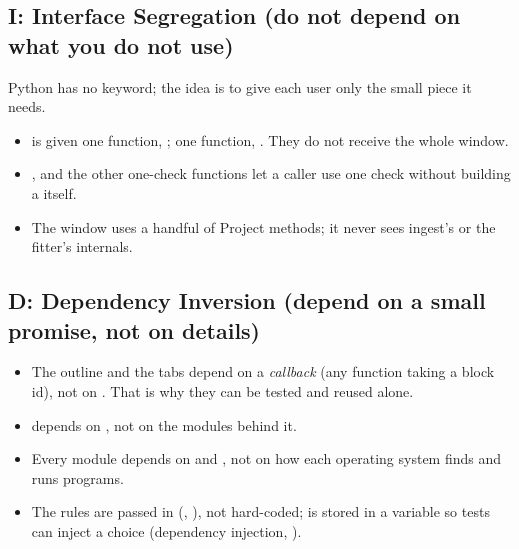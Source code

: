 \subsection*{I: Interface Segregation (do not depend on what you do not use)}
Python has no  keyword; the idea is to give each user only the small piece it needs.
\begin{itemize}
\item \hyperref[u:ui/outline:Outline.__init__]{} is given one function, ; \hyperref[u:ui/panels:Panels.__init__]{} one function, . They do not receive the whole window.
\item \hyperref[u:checks:check_fonts]{},  and the other one-check functions let a caller use one check without building a  itself.
\item The window uses a handful of Project methods; it never sees ingest's or the fitter's internals.
\end{itemize}

\subsection*{D: Dependency Inversion (depend on a small promise, not on details)}
\begin{itemize}
\item The outline and the tabs depend on a \emph{callback} (any function taking a block id), not on . That is why they can be tested and reused alone.
\item {} depends on \hyperref[u:project:Project]{}, not on the modules behind it.
\item Every module depends on \hyperref[u:process:find_tool]{} and , not on how each operating system finds and runs programs.
\item The rules are passed in (, ), not hard-coded;  is stored in a variable so tests can inject a choice (dependency injection, \hyperref[u:ui/window:MainWindow.__init__]{}).
\end{itemize}

